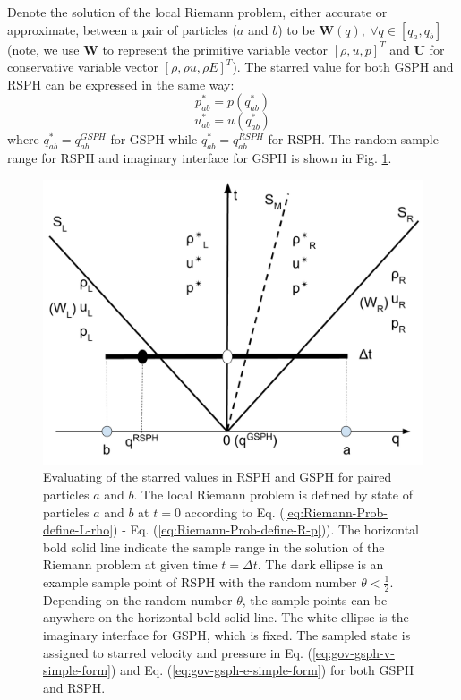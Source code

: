 Denote the solution of the local Riemann problem, either accurate or approximate, between a pair of particles ($a$ and $b$) to be $\textbf{W} (q), \  \forall q \in [q_a, q_b]$ (note, we use $\textbf{W}$ to represent the primitive variable vector $[\rho, u, p]^T$ and $\textbf{U}$ for conservative variable vector  $[\rho, \rho u, \rho E]^T$). The starred value for both GSPH and RSPH can be expressed in the same way:
\begin{equation}
p_{ab}^{\ast} = p \left(q_{ab}^{\ast} \right)
\label{eq:RSPH-Random-Pick-p}
\end{equation}
\begin{equation}
u_{ab}^{\ast} = u \left(q_{ab}^{\ast} \right)
\label{eq:RSPH-Random-Pick-u}
\end{equation}
where $q_{ab}^{\ast}=q_{ab}^{GSPH}$ for GSPH while $q_{ab}^{\ast}=q_{ab}^{RSPH}$ for RSPH. The random sample range for RSPH and imaginary interface for GSPH is shown in Fig. \ref{fig:pick-up-state-GSPH-RSPH}.
\begin{figure}
    \center
	\includegraphics[width=0.5 \textwidth]{Chapter-4/Figures/RSPH-GSPH}
    \caption{Evaluating of the starred values in RSPH and GSPH for paired particles $a$ and $b$. The local Riemann problem is defined by state of particles $a$ and $b$ at $t=0$ according to Eq. (\ref{eq:Riemann-Prob-define-L-rho}) - Eq. (\ref{eq:Riemann-Prob-define-R-p})). The horizontal bold solid line indicate the sample range in the solution of the Riemann problem at given time $t=\Delta t$. The dark ellipse is an example sample point of RSPH with the random number $\theta < \frac{1}{2}$. Depending on the random number $\theta$, the sample points can be anywhere on the horizontal bold solid line. The white ellipse is the imaginary interface for GSPH, which is fixed. The sampled state is assigned to starred velocity and pressure in Eq. (\ref{eq:gov-gsph-v-simple-form}) and Eq. (\ref{eq:gov-gsph-e-simple-form}) for both GSPH and RSPH.}
    \label{fig:pick-up-state-GSPH-RSPH}
\end{figure}

